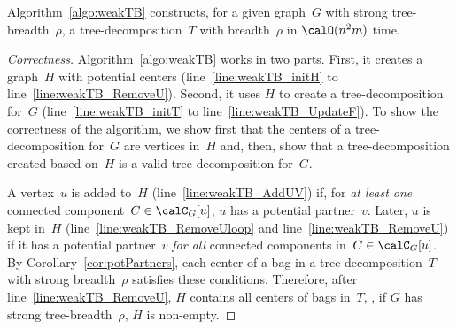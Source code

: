 \begin{theorem}
Algorithm~\ref{algo:weakTB} constructs, for a given graph~\( G \) with strong tree-breadth~\( \rho \), a tree-decomposition~\( T \) with breadth~\( \rho \) in \( \calO(n^2m) \) time.
\end{theorem}

\begin{proof}
    [Correctness]
Algorithm~\ref{algo:weakTB} works in two parts.
First, it creates a graph~$H$ with potential centers (line~\ref{line:weakTB_initH} to line~\ref{line:weakTB_RemoveU}).
Second, it uses $H$ to create a tree-decomposition for~$G$ (line~\ref{line:weakTB_initT} to line~\ref{line:weakTB_UpdateF}).
To show the correctness of the algorithm, we show first that the centers of a tree-decomposition for~$G$ are vertices in~$H$ and, then, show that a tree-decomposition created based on~$H$ is a valid tree-decomposition for~$G$.

A vertex~$u$ is added to~$H$ (line~\ref{line:weakTB_AddUV}) if, for \emph{at least one} connected component~$C \in \calC_G[u]$, $u$ has a potential partner~$v$.
Later, $u$ is kept in~$H$ (line~\ref{line:weakTB_RemoveUloop} and line~\ref{line:weakTB_RemoveU}) if it has a potential partner~$v$ \emph{for all} connected components in~$C \in \calC_G[u]$.
By Corollary~\ref{cor:potPartners}, each center of a bag in a tree-decomposition~$T$ with strong breadth~$\rho$ satisfies these conditions.
Therefore, after line~\ref{line:weakTB_RemoveU}, $H$ contains all centers of bags in~$T$, \ie, if $G$ has strong tree-breadth~$\rho$, $H$ is non-empty.


\end{proof}
